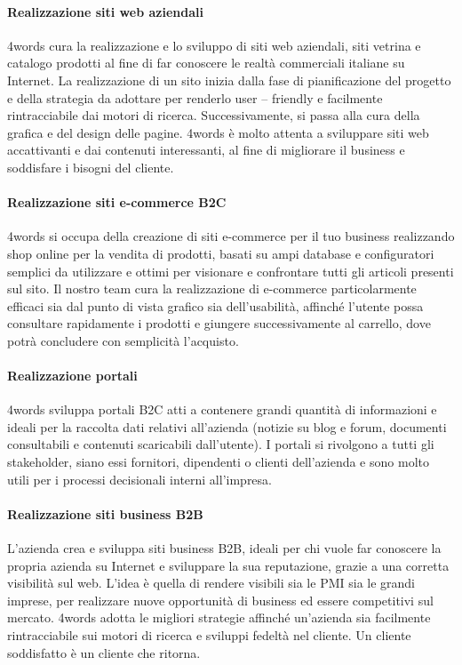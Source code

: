 \paragraph{Realizzazione siti web aziendali} 4words cura la realizzazione e lo sviluppo di siti web aziendali, siti vetrina e catalogo prodotti al fine di far conoscere le realtà commerciali italiane su Internet. La realizzazione di un sito inizia dalla fase di pianificazione del progetto e della strategia da adottare per renderlo user – friendly e facilmente rintracciabile dai motori di ricerca. Successivamente, si passa alla cura della grafica e del design delle pagine. 4words è molto attenta a sviluppare siti web accattivanti e dai contenuti interessanti, al fine di migliorare il business e soddisfare i bisogni del cliente.
\paragraph{Realizzazione siti e-commerce B2C} 4words si occupa della creazione di siti e-commerce per il tuo business realizzando shop online per la vendita di prodotti, basati su ampi database e configuratori semplici da utilizzare e ottimi per visionare e confrontare tutti gli articoli presenti sul sito. Il nostro team cura la realizzazione di e-commerce particolarmente efficaci sia dal punto di vista grafico sia dell'usabilità, affinché l'utente possa consultare rapidamente i prodotti e giungere successivamente al carrello, dove potrà concludere con semplicità l'acquisto.
\paragraph{Realizzazione portali} 4words sviluppa portali B2C atti a contenere grandi quantità di informazioni e ideali per la raccolta dati relativi all'azienda (notizie su blog e forum, documenti consultabili e contenuti scaricabili dall'utente). I portali si rivolgono a tutti gli \gls{stakeholder}, siano essi fornitori, dipendenti o clienti dell'azienda e sono molto utili per i processi decisionali interni all'impresa.
\paragraph{Realizzazione siti business B2B} L'azienda crea e sviluppa siti business B2B, ideali per chi vuole far conoscere la propria azienda su Internet e sviluppare la sua reputazione, grazie a una corretta visibilità sul web.
L'idea è quella di rendere visibili sia le PMI sia le grandi imprese, per realizzare nuove opportunità di business ed essere competitivi sul mercato. 4words adotta le migliori strategie affinché un'azienda sia facilmente rintracciabile sui motori di ricerca e sviluppi fedeltà nel cliente. Un cliente soddisfatto è un cliente che ritorna.

